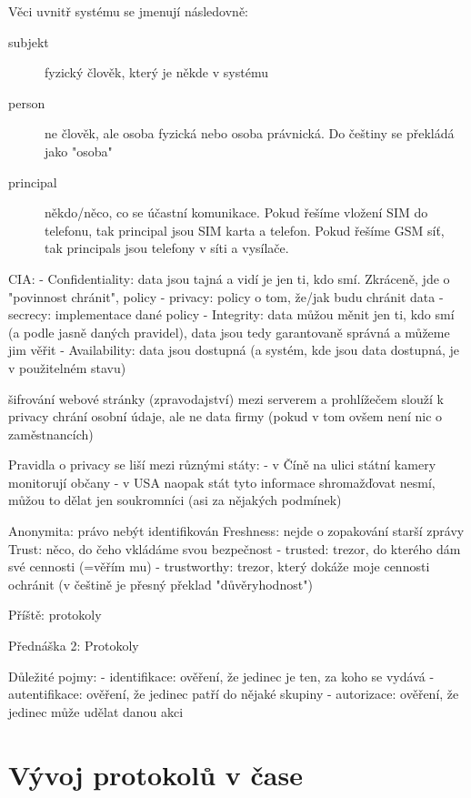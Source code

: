 Věci uvnitř systému se jmenují následovně:
\begin{description}
\item[subjekt] fyzický člověk, který je někde v systému
\item[person] ne člověk, ale osoba fyzická nebo osoba právnická. Do češtiny se překládá jako "osoba"
\item[principal] někdo/něco, co se účastní komunikace. Pokud řešíme vložení SIM do telefonu, tak principal jsou SIM karta a telefon. Pokud řešíme GSM síť, tak principals jsou telefony v síti a vysílače.
\end{description}

   
CIA:
 - Confidentiality: data jsou tajná a vidí je jen ti, kdo smí. Zkráceně, jde o "povinnost chránit", policy
   - privacy: policy o tom, že/jak budu chránit data
   - secrecy: implementace dané policy
 - Integrity: data můžou měnit jen ti, kdo smí (a podle jasně daných pravidel), data jsou tedy garantovaně správná a můžeme jim věřit
 - Availability: data jsou dostupná (a systém, kde jsou data dostupná, je v použitelném stavu)

šifrování webové stránky (zpravodajství) mezi serverem a prohlížečem slouží k 
privacy chrání osobní údaje, ale ne data firmy (pokud v tom ovšem není nic o zaměstnancích)

Pravidla o privacy se liší mezi různými státy:
 - v Číně na ulici státní kamery monitorují občany
 - v USA naopak stát tyto informace shromažďovat nesmí, můžou to dělat jen soukromníci (asi za nějakých podmínek)
 


 
Anonymita: právo nebýt identifikován
Freshness: nejde o zopakování starší zprávy
Trust: něco, do čeho vkládáme svou bezpečnost
 - trusted: trezor, do kterého dám své cennosti (=věřím mu)
 - trustworthy: trezor, který dokáže moje cennosti ochránit (v češtině je přesný překlad "důvěryhodnost")

Příště: protokoly



Přednáška 2: 
Protokoly

 Důležité pojmy:
 - identifikace: ověření, že jedinec je ten, za koho se vydává
 - autentifikace: ověření, že jedinec patří do nějaké skupiny
 - autorizace: ověření, že jedinec může udělat danou akci


\section{Vývoj protokolů v čase}

